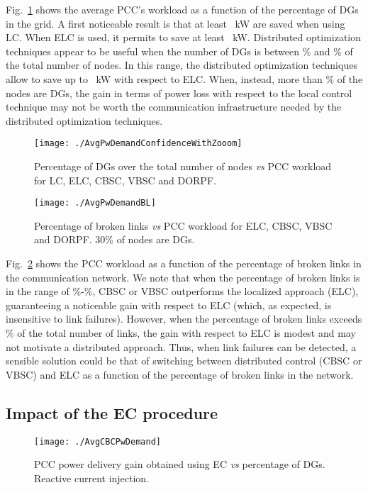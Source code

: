 \documentclass[journal]{IEEEtran}
\newcommand{\fig}[1]{Fig.~\ref{#1}}
\begin{document}
\fig{figure:AVGPW} shows the average PCC's workload as a function of the percentage of DGs in the grid. A first noticeable result is that at least ~kW are saved when using LC. When ELC is used, it permits to save at least ~kW. Distributed optimization techniques appear to be useful when the number of DGs is between \% and \% of the total number of nodes. In this range, the distributed optimization techniques allow to save up to ~kW with respect to ELC. When, instead, more than \% of the nodes are DGs, the gain in terms of power loss with respect to the local control technique may not be worth the communication infrastructure needed by the distributed optimization techniques. 

\begin{figure}
\centering
\texttt{[image: ./AvgPwDemandConfidenceWithZooom]}
\caption{Percentage of DGs over the total number of nodes {\it vs} PCC workload for LC, ELC, CBSC, VBSC and DORPF.\label{figure:AVGPW}}
\end{figure}

\begin{figure}
\centering
\texttt{[image: ./AvgPwDemandBL]}
\caption{Percentage of broken links {\it vs} PCC workload for ELC, CBSC, VBSC and DORPF. 30\% of nodes are DGs.\label{figure:AVGPWBL}}
\end{figure}

\fig{figure:AVGPWBL} shows the PCC workload as a function of the percentage of broken links in the communication network. We note that when the percentage of broken links is in the range of \%-\%, CBSC or VBSC outperforms the localized approach (ELC), guaranteeing a noticeable gain with respect to ELC (which, as expected, is insensitive to link failures). However, when the percentage of broken links exceeds \% of the total number of links, the gain with respect to ELC is modest and may not motivate a distributed approach. Thus, when link failures can be detected, a sensible solution could be that of switching between distributed control (CBSC or VBSC) and ELC as a function of the percentage of broken links in the network.

\subsection{Impact of the EC procedure}
\label{ssec:impEC}

\begin{figure}
\centering
\texttt{[image: ./AvgCBCPwDemand]}
\caption{PCC power delivery gain obtained using EC {\it vs} percentage of DGs. Reactive current injection.
\label{figure:AVGCBCPW}}
\end{figure}
\end{document}
